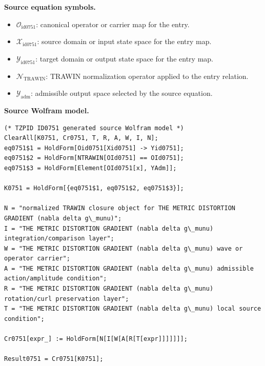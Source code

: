 \begin{minipage}[t]{0.49\linewidth}
\begingroup
\small
\raggedright
\textbf{Source equation symbols.}\par
\begin{itemize}[leftmargin=1.35em,itemsep=1pt,topsep=1pt,parsep=0pt]
    \item $\mathcal{O}_{\mathrm{id0751}}$: canonical operator or carrier map for the entry.
    \item $\mathcal{X}_{\mathrm{id0751}}$: source domain or input state space for the entry map.
    \item $\mathcal{Y}_{\mathrm{id0751}}$: target domain or output state space for the entry map.
    \item $\mathcal{N}_{\mathrm{TRAWIN}}$: TRAWIN normalization operator applied to the entry relation.
    \item $\mathcal{Y}_{\mathrm{adm}}$: admissible output space selected by the source equation.
\end{itemize}
\endgroup
\end{minipage}\hfill
\begin{minipage}[t]{0.47\linewidth}
\begingroup
\scriptsize
\raggedright
\textbf{Source Wolfram model.}\par
\begin{Verbatim}[fontsize=\tiny,breaklines=true,breakanywhere=true]
(* TZPID ID0751 generated source Wolfram model *)
ClearAll[K0751, Cr0751, T, R, A, W, I, N];
eq0751$1 = HoldForm[Oid0751[Xid0751] -> Yid0751];
eq0751$2 = HoldForm[NTRAWIN[OId0751] == OId0751];
eq0751$3 = HoldForm[Element[OId0751[x], YAdm]];

K0751 = HoldForm[{eq0751$1, eq0751$2, eq0751$3}];

N = "normalized TRAWIN closure object for THE METRIC DISTORTION GRADIENT (nabla delta g\_munu)";
I = "THE METRIC DISTORTION GRADIENT (nabla delta g\_munu) integration/comparison layer";
W = "THE METRIC DISTORTION GRADIENT (nabla delta g\_munu) wave or operator carrier";
A = "THE METRIC DISTORTION GRADIENT (nabla delta g\_munu) admissible action/amplitude condition";
R = "THE METRIC DISTORTION GRADIENT (nabla delta g\_munu) rotation/curl preservation layer";
T = "THE METRIC DISTORTION GRADIENT (nabla delta g\_munu) local source condition";

Cr0751[expr_] := HoldForm[N[I[W[A[R[T[expr]]]]]]];

Result0751 = Cr0751[K0751];
\end{Verbatim}
\endgroup
\end{minipage}

